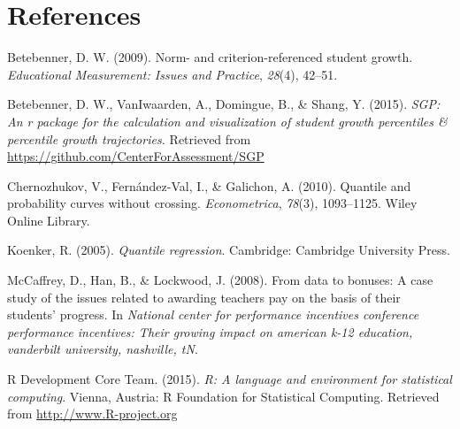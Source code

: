 \documentclass[12pt]{article}
\begin{document}
\pagebreak

\section*{References}\label{references}

Betebenner, D. W. (2009). Norm- and criterion-referenced student growth.
\emph{Educational Measurement: Issues and Practice}, \emph{28}(4),
42--51.

Betebenner, D. W., {VanIwaarden}, A., Domingue, B., \& Shang, Y. (2015).
\emph{SGP: An r package for the calculation and visualization of student
growth percentiles \& percentile growth trajectories.} Retrieved from
\url{https://github.com/CenterForAssessment/SGP}

Chernozhukov, V., Fern{á}ndez-Val, I., \& Galichon, A. (2010). Quantile
and probability curves without crossing. \emph{Econometrica},
\emph{78}(3), 1093--1125. Wiley Online Library.

Koenker, R. (2005). \emph{Quantile regression}. Cambridge: Cambridge
University Press.

McCaffrey, D., Han, B., \& Lockwood, J. (2008). From data to bonuses: A
case study of the issues related to awarding teachers pay on the basis
of their students' progress. In \emph{National center for performance
incentives conference performance incentives: Their growing impact on
american k-12 education, vanderbilt university, nashville, tN}.

R Development Core Team. (2015). \emph{R: A language and environment for
statistical computing}. Vienna, Austria: R Foundation for Statistical
Computing. Retrieved from \url{http://www.R-project.org}



\end{document}
